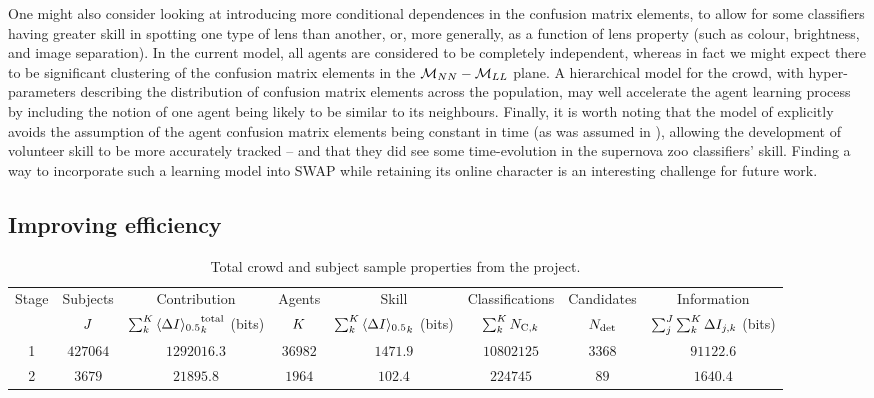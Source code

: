 \documentclass[useAMS,usenatbib,a4paper]{mn2e}
\begin{document}
One might also consider looking at
introducing more conditional dependences in the confusion matrix elements, to
allow for some classifiers having greater skill in spotting one type of lens
than another, or, more generally, as a function of lens property (such as
colour, brightness, and image separation). In the current model, all agents are
considered to be completely independent, whereas in fact we might expect there
to be significant clustering of the confusion matrix elements in the $\mathcal{M}_{NN} - \mathcal{M}_{LL}$
plane. A hierarchical
model for the crowd, with hyper-parameters describing the distribution of
confusion matrix elements across the population, may well accelerate the agent
learning process by including the notion of one agent being likely to be
similar to its neighbours. Finally, it is worth noting that the model of
\citet{IBCC} explicitly avoids the assumption of the agent confusion matrix
elements being constant in time (as was assumed in ),
allowing the development of volunteer skill
to be more accurately tracked -- and that they did see some time-evolution in
the supernova zoo classifiers' skill. Finding a way to incorporate such a
learning model into SWAP while retaining its online character
is an interesting challenge for future work.




\subsection{Improving efficiency}
\label{sec:discuss:efficiency}


\begin{table}
\begin{center}
\caption{Total crowd and subject sample properties from the \cfhtls project.}
\label{tab:crowd:contributions}
\begin{tabular}{cccccccc}
  \hline
  \hline {Stage} & Subjects & Contribution                          & Agents & Skill      & Classifications          & Candidates & Information \\
                           & $J$    & $\sum_k^{K} {\langle \Delta I \rangle_{0.5}}^{\rm total}_k$ (bits) & $K$  & $\sum_k^{K} {\langle \Delta I \rangle_{0.5}}_k$ (bits) & $\sum_k^{K} N_{{\rm C},k}$ & $N_{\rm det}$  & $\sum_j^{J}\sum_k^{K} \Delta I_{j,k}$ (bits) \\
            \hline
                      1    & $427064$ & $1292016.3$ & $36982$ & $1471.9$ & $10802125$ & $3368$ & $91122.6$ \\
                      2    & $3679$   &   $21895.8$ &  $1964$ &  $102.4$ &   $224745$ &   $89$ &  $1640.4$ \\
  \hline \hline
\end{tabular}
\medskip\\
\end{center}
\end{table}
\end{document}

